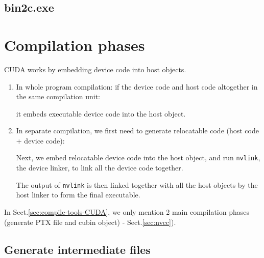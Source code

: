 

\subsection{bin2c.exe}


\section{Compilation phases}
\label{sec:compilation-phases}

CUDA works by embedding device code into host objects. 
\begin{enumerate}  
  \item In whole program compilation: if the device code and host code altogether in the same compilation unit:
  
  it embeds executable device code into the host object.
  
  \item In separate compilation, we first need to generate relocatable code (host code + device code):
  
  Next, we embed relocatable device code into the host object, and run
  \verb!nvlink!, the device linker, to link all the device code together.
  
  The output of \verb!nvlink! is then linked together with all the host objects by the
  host linker to form the final executable.
  
\end{enumerate}


In Sect.\ref{sec:compile-tools-CUDA}, we only mention 2 main
compilation phases (generate PTX file and cubin object) - Sect.\ref{sec:nvcc}). 


\subsection{Generate intermediate files}
\label{sec:gener-intermd-files}

